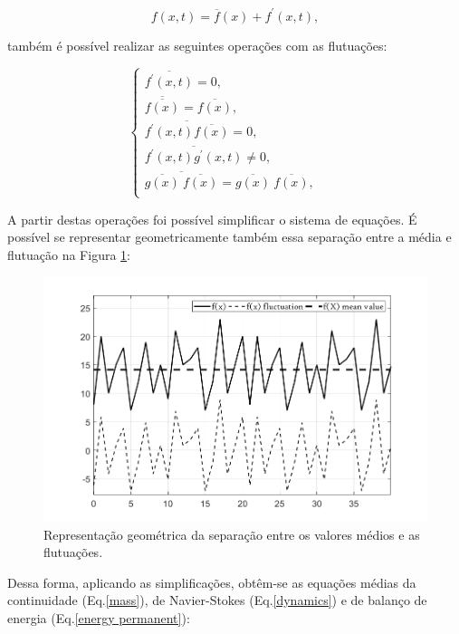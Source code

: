 \begin{equation}
  f({x} , t) = \overline{f}({x}) + f^\prime ({x} ,t),
\end{equation}

também é possível realizar as seguintes operações com as flutuações:

\begin{equation}
  \begin{cases}
  \overline{f^\prime ({x} ,t)} = 0 , & \quad   \\
  \overline{\overline{f({x})}} = \overline{f({x})} , & \quad   \\
  \overline{f^\prime ({x} ,t)\overline{f({x})}} = 0 ,& \quad   \\
  \overline{f^\prime ({x} ,t)g^\prime ({x} ,t)} \neq 0 , & \quad   \\
  \overline{  \overline{g({x})} \ \overline{f({x})}  } = {\overline{g({x})}} \ {\overline{f({x})}} , & \quad   \\
  \end{cases}
\end{equation}

A partir destas operações foi possível simplificar o sistema de equações. É possível se representar geometricamente também essa separação entre a média e flutuação na Figura \ref{figura.1}:

\begin{figure}[h!]
	\centering
	\includegraphics[angle=0, scale=0.60]{medios}
	\caption{Representação geométrica da separação entre os valores médios e as flutuações.}
	\label{figura.1}
\end{figure}

Dessa forma, aplicando as simplificações, obtêm-se as equações médias da continuidade (Eq.\ref{mass}), de Navier-Stokes (Eq.\ref{dynamics}) e de balanço de energia (Eq.\ref{energy permanent}):

